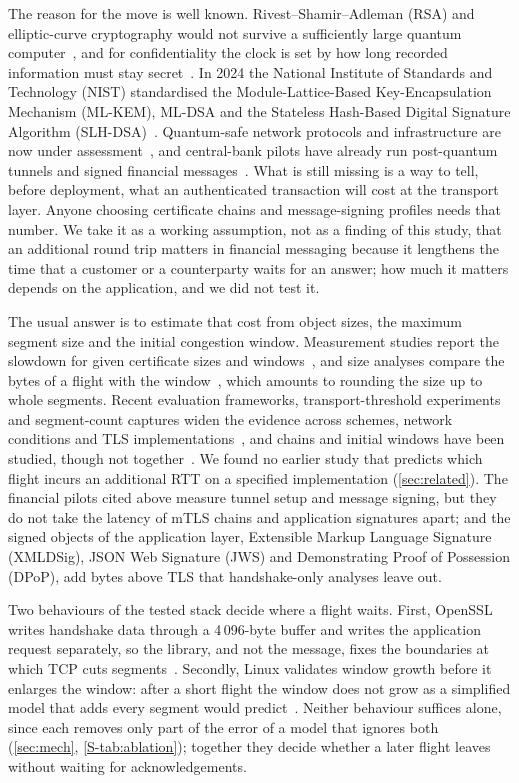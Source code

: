 \documentclass[preprint,12pt]{elsarticle}
\begin{document}
The reason for the move is well known. Rivest--Shamir--Adleman (RSA) and elliptic-curve cryptography would not survive a sufficiently large quantum computer~\cite{shor1994}, and for confidentiality the clock is set by how long recorded information must stay secret~\cite{mosca2018,baradziej2026}. In 2024 the National Institute of Standards and Technology (NIST) standardised the Module-Lattice-Based Key-Encapsulation Mechanism (ML-KEM), ML-DSA and the Stateless Hash-Based Digital Signature Algorithm (SLH-DSA)~\cite{fips203,fips204,fips205}. Quantum-safe network protocols and infrastructure are now under assessment~\cite{baseri2024,baseri2026}, and central-bank pilots have already run post-quantum tunnels and signed financial messages~\cite{bis_leap2023,bis_leap2025}. What is still missing is a way to tell, before deployment, what an authenticated transaction will cost at the transport layer. Anyone choosing certificate chains and message-signing profiles needs that number. We take it as a working assumption, not as a finding of this study, that an additional round trip matters in financial messaging because it lengthens the time that a customer or a counterparty waits for an answer; how much it matters depends on the application, and we did not test it.

The usual answer is to estimate that cost from object sizes, the maximum segment size and the initial congestion window. Measurement studies report the slowdown for given certificate sizes and windows~\cite{sikeridis2020,paquin2020,kampanakis2024}, and size analyses compare the bytes of a flight with the window~\cite{kampanakis2022}, which amounts to rounding the size up to whole segments. Recent evaluation frameworks, transport-threshold experiments and segment-count captures widen the evidence across schemes, network conditions and TLS implementations~\cite{montenegro2026,montenegro2026quic,zhao2026,dubetskyy2026}, and chains and initial windows have been studied, though not together~\cite{henrich2025}. We found no earlier study that predicts which flight incurs an additional RTT on a specified implementation (\cref{sec:related}). The financial pilots cited above measure tunnel setup and message signing, but they do not take the latency of mTLS chains and application signatures apart; and the signed objects of the application layer, Extensible Markup Language Signature (XMLDSig), JSON Web Signature (JWS) and Demonstrating Proof of Possession (DPoP), add bytes above TLS that handshake-only analyses leave out.

Two behaviours of the tested stack decide where a flight waits. First, OpenSSL writes handshake data through a 4\,096-byte buffer and writes the application request separately, so the library, and not the message, fixes the boundaries at which TCP cuts segments~\cite{sosnowski2023}. Secondly, Linux validates window growth before it enlarges the window: after a short flight the window does not grow as a simplified model that adds every segment would predict~\cite{linuxtcp}. Neither behaviour suffices alone, since each removes only part of the error of a model that ignores both (\cref{sec:mech}, \cref{S-tab:ablation}); together they decide whether a later flight leaves without waiting for acknowledgements.
\end{document}

